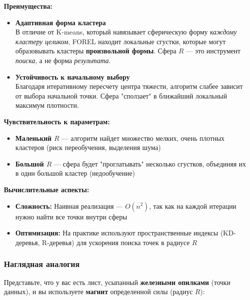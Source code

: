 \documentclass[11pt]{article}
\begin{document}
\textbf{Преимущества:}
\begin{itemize}
    \item \textbf{Адаптивная форма кластера} \\
    В отличие от K-means, который навязывает сферическую форму \textit{каждому кластеру целиком}, FOREL находит локальные сгустки, которые могут образовывать кластеры \textbf{произвольной формы}. Сфера $R$ — это инструмент \textit{поиска}, а не форма \textit{результата}.
    
    \item \textbf{Устойчивость к начальному выбору} \\
    Благодаря итеративному пересчету центра тяжести, алгоритм слабее зависит от выбора начальной точки. Сфера "сползает" в ближайший локальный максимум плотности.
\end{itemize}

\textbf{Чувствительность к параметрам:}
\begin{itemize}
    \item \textbf{Маленький $R$} — алгоритм найдет множество мелких, очень плотных кластеров (риск переобучения, выделения шума)
    \item \textbf{Большой $R$} — сфера будет "проглатывать" несколько сгустков, объединяя их в один большой кластер (недообучение)
\end{itemize}

\textbf{Вычислительные аспекты:}
\begin{itemize}
    \item \textbf{Сложность:} Наивная реализация — $O(n^2)$, так как на каждой итерации нужно найти все точки внутри сферы
    \item \textbf{Оптимизация:} На практике используют пространственные индексы (KD-деревья, R-деревья) для ускорения поиска точек в радиусе $R$
\end{itemize}

\subsubsection{Наглядная аналогия}

Представьте, что у вас есть лист, усыпанный \textbf{железными опилками} (точки данных), и вы используете \textbf{магнит} определенной силы (радиус $R$):
\end{document}
